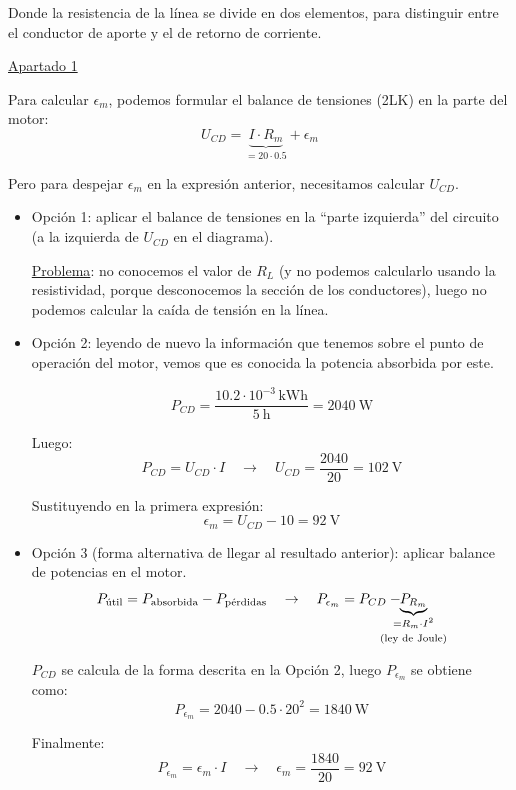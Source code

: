 \documentclass[10pt]{article}
\begin{document}
\vspace{6mm}

Donde la resistencia de la línea se divide en dos elementos, para distinguir entre el conductor de aporte y el de retorno de corriente.

\vspace{6mm}

\underline{Apartado 1}

\vspace{4mm}

Para calcular $\epsilon_m$, podemos formular el balance de tensiones (2LK) en la parte del motor:
\[
  U_{CD} = \underbrace{I \cdot R_m}_{= 20 \cdot 0.5} + \epsilon_m
\]

Pero para despejar $\epsilon_m$ en la expresión anterior, necesitamos calcular $U_{CD}$.
\begin{itemize}
    \item Opción 1: aplicar el balance de tensiones en la ``parte izquierda'' del circuito (a la izquierda de $U_{CD}$ en el diagrama). 
    
    \underline{Problema}: no conocemos el valor de $R_L$ (y no podemos calcularlo usando la resistividad, porque desconocemos la sección de los conductores), luego no podemos calcular la caída de tensión en la línea.
    
    \item Opción 2: leyendo de nuevo la información que tenemos sobre el punto de operación del motor, vemos que es conocida la potencia absorbida por este.

    \[
      P_{CD} = \frac{10.2 \cdot 10^{-3} \, \si{\kWh}}{\qty{5}{\hour}} = \qty{2040}{\watt}
    \]

    Luego:
    \[
      P_{CD} = U_{CD} \cdot I \quad \rightarrow \quad U_{CD} = \frac{2040}{20} = \qty{102}{\volt}
    \]

    Sustituyendo en la primera expresión:
    \[
      \epsilon_m = U_{CD} - 10 = \boxed{ \qty{92}{\volt} }
    \]

    \item Opción 3 (forma alternativa de llegar al resultado anterior): aplicar balance de potencias en el motor.
    \[
      P_{\textrm{útil}} = P_{\textrm{absorbida}} - P_{\textrm{pérdidas}} \quad \rightarrow \quad P_{\epsilon_m} = P_{CD} - \hspace{-6mm} \underbrace{P_{R_m}}_{\substack{= R_m \cdot I^2 \\[3pt] \text{(ley de Joule)}}}
    \]
    
    $P_{CD}$ se calcula de la forma descrita en la Opción 2, luego $P_{\epsilon_m}$ se obtiene como:
    \[
      P_{\epsilon_m} = 2040 - 0.5 \cdot 20^2 = \qty{1840}{\watt}
    \]

    Finalmente: 
    \[
      P_{\epsilon_m} = \epsilon_m \cdot I \quad \rightarrow \quad \epsilon_m = \frac{1840}{20} = \boxed{ \qty{92}{\volt} }
    \]
\end{itemize}
\end{document}
